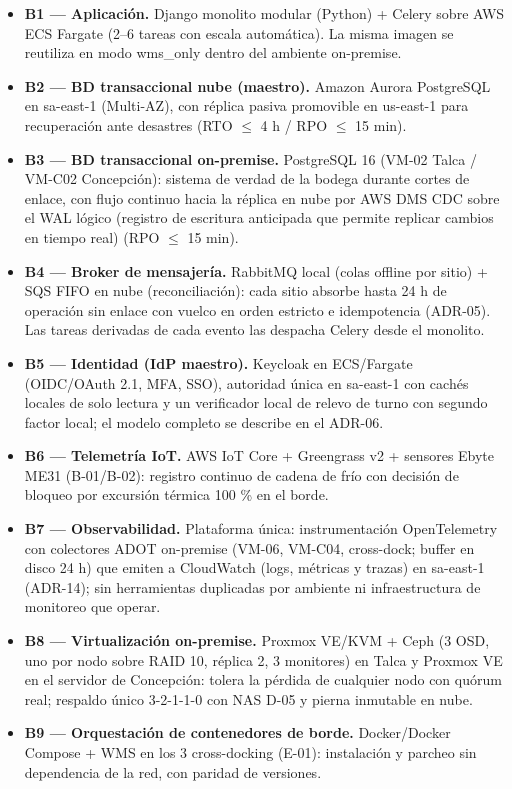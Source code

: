 \begin{itemize}
  \item \textbf{B1 --- Aplicación.} Django monolito modular (Python) + Celery sobre AWS ECS Fargate (2--6 tareas con escala automática). La misma imagen se reutiliza en modo wms\_only dentro del ambiente on-premise.
  \item \textbf{B2 --- BD transaccional nube (maestro).} Amazon Aurora PostgreSQL en sa-east-1 (Multi-AZ), con réplica pasiva promovible en us-east-1 para recuperación ante desastres (RTO $\leq$ 4 h / RPO $\leq$ 15 min).
  \item \textbf{B3 --- BD transaccional on-premise.} PostgreSQL 16 (VM-02 Talca / VM-C02 Concepción): sistema de verdad de la bodega durante cortes de enlace, con flujo continuo hacia la réplica en nube por AWS DMS CDC sobre el WAL lógico (registro de escritura anticipada que permite replicar cambios en tiempo real) (RPO $\leq$ 15 min).
  \item \textbf{B4 --- Broker de mensajería.} RabbitMQ local (colas offline por sitio) + SQS FIFO en nube (reconciliación): cada sitio absorbe hasta 24 h de operación sin enlace con vuelco en orden estricto e idempotencia (ADR-05). Las tareas derivadas de cada evento las despacha Celery desde el monolito.
  \item \textbf{B5 --- Identidad (IdP maestro).} Keycloak en ECS/Fargate (OIDC/OAuth 2.1, MFA, SSO), autoridad única en sa-east-1 con cachés locales de solo lectura y un verificador local de relevo de turno con segundo factor local; el modelo completo se describe en el ADR-06.
  \item \textbf{B6 --- Telemetría IoT.} AWS IoT Core + Greengrass v2 + sensores Ebyte ME31 (B-01/B-02): registro continuo de cadena de frío con decisión de bloqueo por excursión térmica 100 \% en el borde.
  \item \textbf{B7 --- Observabilidad.} Plataforma única: instrumentación OpenTelemetry con colectores ADOT on-premise (VM-06, VM-C04, cross-dock; buffer en disco 24 h) que emiten a CloudWatch (logs, métricas y trazas) en sa-east-1 (ADR-14); sin herramientas duplicadas por ambiente ni infraestructura de monitoreo que operar.
  \item \textbf{B8 --- Virtualización on-premise.} Proxmox VE/KVM + Ceph (3 OSD, uno por nodo sobre RAID 10, réplica 2, 3 monitores) en Talca y Proxmox VE en el servidor de Concepción: tolera la pérdida de cualquier nodo con quórum real; respaldo único 3-2-1-1-0 con NAS D-05 y pierna inmutable en nube.
  \item \textbf{B9 --- Orquestación de contenedores de borde.} Docker/Docker Compose + WMS en los 3 cross-docking (E-01): instalación y parcheo sin dependencia de la red, con paridad de versiones.

\end{itemize}
